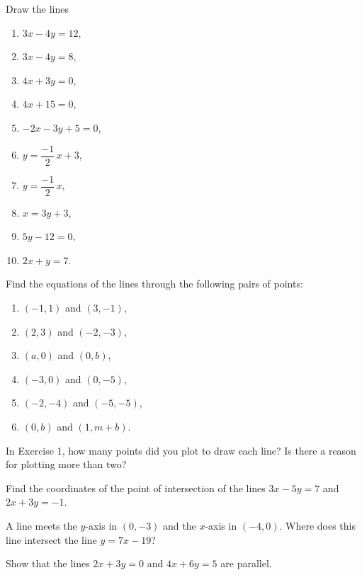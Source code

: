 \documentclass[11pt]{book}
\theoremstyle{bkplain}
\theoremstyle{XIplainnote}
\theoremstyle{bkplain}
\theoremstyle{bkplain}
\begin{document}
\begin{exercisecols}
\begin{exlist}
\item Draw the lines
  \begin{enumerate}[label=(\alph*),leftmargin=1.5em,itemsep=0pt,topsep=2pt,
    parsep=0pt]
  \item $3x - 4y = 12$,
  \item $3x - 4y = 8$,
  \item $4x + 3y = 0$,
  \item $4x + 15 = 0$,
  \item $-2x - 3y + 5 = 0$,
  \item $y = \dfrac{-1}{2}\,x + 3$,
  \item $y = \dfrac{-1}{2}\,x$,
  \item $x = 3y + 3$,
  \item[(k)] $5y - 12 = 0$,
  \item[(l)] $2x + y = 7$.
  \end{enumerate}
\item Find the equations of the lines through the following pairs of points:
  \begin{enumerate}[label=(\alph*),leftmargin=1.5em,itemsep=0pt,topsep=2pt,
    parsep=0pt]
  \item $(-1, 1)$ and $(3, -1)$,
  \item $(2, 3)$ and $(-2, -3)$,
  \item $(a, 0)$ and $(0, b)$,
  \item $(-3, 0)$ and $(0, -5)$,
  \item $(-2, -4)$ and $(-5, -5)$,
  \item $(0, b)$ and $(1, m + b)$.
  \end{enumerate}
\item In Exercise 1, how many points did you plot to draw each line? Is there
  a reason for plotting more than two?
\item Find the coordinates of the point of intersection of the lines
  $3x - 5y = 7$ and $2x + 3y = -1$.
\item A line meets the $y$-axis in $(0, -3)$ and the $x$-axis in $(-4, 0)$.
  Where does this line intersect the line $y = 7x - 19$?
\item Show that the lines $2x + 3y = 0$ and $4x + 6y = 5$ are parallel.
\end{exlist}
\end{exercisecols}

\end{document}
